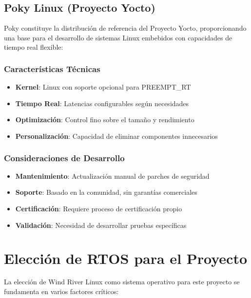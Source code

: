     \subsection{Poky Linux (Proyecto Yocto)}
    Poky constituye la distribución de referencia del Proyecto Yocto, proporcionando una base para el desarrollo de sistemas Linux embebidos con capacidades de tiempo real flexible:

        \subsubsection{Características Técnicas}
        \begin{itemize}
            \item \textbf{Kernel}: Linux con soporte opcional para PREEMPT\_RT
            \item \textbf{Tiempo Real}: Latencias configurables según necesidades
            \item \textbf{Optimización}: Control fino sobre el tamaño y rendimiento
            \item \textbf{Personalización}: Capacidad de eliminar componentes innecesarios
        \end{itemize}

        \subsubsection{Consideraciones de Desarrollo}
        \begin{itemize}
            \item \textbf{Mantenimiento}: Actualización manual de parches de seguridad
            \item \textbf{Soporte}: Basado en la comunidad, sin garantías comerciales
            \item \textbf{Certificación}: Requiere proceso de certificación propio
            \item \textbf{Validación}: Necesidad de desarrollar pruebas específicas
        \end{itemize}



\newpage
\section{Elección de RTOS para el Proyecto}

    La elección de Wind River Linux como sistema operativo para este proyecto se fundamenta en varios factores críticos:

